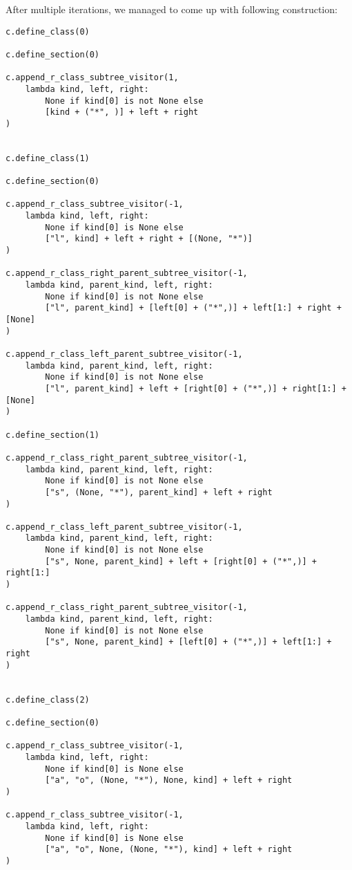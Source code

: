 \documentclass[final]{article}
\theoremstyle{definition}
\theoremstyle{definition}
\theoremstyle{remark}
\begin{document}
After multiple iterations, we managed to come up with following construction:

\begin{lstlisting}
c.define_class(0)

c.define_section(0)

c.append_r_class_subtree_visitor(1,
    lambda kind, left, right:
        None if kind[0] is not None else
        [kind + ("*", )] + left + right
)


c.define_class(1)

c.define_section(0)

c.append_r_class_subtree_visitor(-1,
    lambda kind, left, right:
        None if kind[0] is None else
        ["l", kind] + left + right + [(None, "*")]
)

c.append_r_class_right_parent_subtree_visitor(-1,
    lambda kind, parent_kind, left, right:
        None if kind[0] is not None else
        ["l", parent_kind] + [left[0] + ("*",)] + left[1:] + right + [None]
)

c.append_r_class_left_parent_subtree_visitor(-1,
    lambda kind, parent_kind, left, right:
        None if kind[0] is not None else
        ["l", parent_kind] + left + [right[0] + ("*",)] + right[1:] + [None]
)

c.define_section(1)

c.append_r_class_right_parent_subtree_visitor(-1,
    lambda kind, parent_kind, left, right:
        None if kind[0] is not None else
        ["s", (None, "*"), parent_kind] + left + right
)

c.append_r_class_left_parent_subtree_visitor(-1,
    lambda kind, parent_kind, left, right:
        None if kind[0] is not None else
        ["s", None, parent_kind] + left + [right[0] + ("*",)] + right[1:]
)

c.append_r_class_right_parent_subtree_visitor(-1,
    lambda kind, parent_kind, left, right:
        None if kind[0] is not None else
        ["s", None, parent_kind] + [left[0] + ("*",)] + left[1:] + right
)


c.define_class(2)

c.define_section(0)

c.append_r_class_subtree_visitor(-1,
    lambda kind, left, right:
        None if kind[0] is None else
        ["a", "o", (None, "*"), None, kind] + left + right
)

c.append_r_class_subtree_visitor(-1,
    lambda kind, left, right:
        None if kind[0] is None else
        ["a", "o", None, (None, "*"), kind] + left + right
)


\end{lstlisting}
\end{document}
